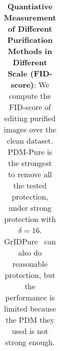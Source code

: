 \begin{table}[t]
{\begin{tabular}{ccccccccc}
\bottomrule
  \end{tabular}

}
\vspace{10pt}
 \caption{
  \textbf{Quantiative Measurement of Different Purification Methods in Different Scale (FID-score)}: We compute the FID-score of editing purified images over the clean dataset. PDM-Pure is the strongest to remove all the tested protection, under strong protection with $\delta=16$. GrIDPure~\cite{zhao2023can} can also do reasonable protection, but the performance is limited because the PDM they used is not strong enough.
  }
  \label{quant_purify}
  \vspace{-0.8cm}
\end{table}